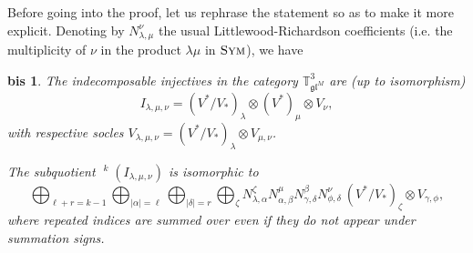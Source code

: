 \documentclass[11pt]{article}
\theoremstyle{plain}
\theoremstyle{nonumberplain}
\newtheorem{thbis}{\Cref{th.soc_filt} bis}
\theoremstyle{plain}
\theoremstyle{nonumberplain}
\newcommand\bT{{\mathbb T}}
\newcommand\fgl{\mathfrak{gl}}
\DeclareMathOperator{\usoc}{\underline{\mathrm{soc}}}
\DeclareMathOperator{\sym}{\cat{Sym}}
\newcommand{\cat}[1]{\textsc{#1}}
\begin{document}
Before going into the proof, let us rephrase the statement so as to make it more explicit. Denoting by $N_{\lambda,\mu}^\nu$ the usual Littlewood-Richardson coefficients (i.e. the multiplicity of $\nu$ in the product $\lambda\mu$ in $\sym$), we have


\begin{thbis}
  The indecomposable injectives in the category $\bT^3_{\fgl^M}$ are (up to isomorphism)
  \begin{equation*}
    I_{\lambda,\mu,\nu}=(V^*/V_*)_\lambda\otimes (V^*)_{\mu}\otimes V_{\nu},
  \end{equation*}
with respective socles $V_{\lambda,\mu,\nu} = (V^*/V_*)_\lambda\otimes V_{\mu,\nu}$. 

    The subquotient $\usoc^k(I_{\lambda,\mu,\nu})$ is  isomorphic to
  \begin{equation}\label{eq.LR}
    \bigoplus_{\ell+r=k-1}\bigoplus_{|\alpha|=\ell}\bigoplus_{|\delta|=r}\bigoplus_\zeta N_{\lambda,\alpha}^\zeta N_{\alpha,\beta}^{\mu}N_{\gamma,\delta}^{\beta}N_{\phi,\delta}^{\nu}~ (V^*/V_*)_{\zeta}\otimes V_{\gamma,\phi},
  \end{equation}
where repeated indices are summed over even if they do not appear under summation signs. 
\end{thbis}
\end{document}
